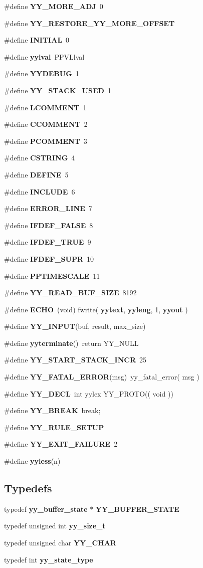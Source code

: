 \begin{CompactItemize}
\item 
\#define {\bf YY\_\-MORE\_\-ADJ}\ 0
\item 
\#define {\bf YY\_\-RESTORE\_\-YY\_\-MORE\_\-OFFSET}
\item 
\#define {\bf INITIAL}\ 0
\item 
\#define {\bf yylval}\ PPVLlval
\item 
\#define {\bf YYDEBUG}\ 1
\item 
\#define {\bf YY\_\-STACK\_\-USED}\ 1
\item 
\#define {\bf LCOMMENT}\ 1
\item 
\#define {\bf CCOMMENT}\ 2
\item 
\#define {\bf PCOMMENT}\ 3
\item 
\#define {\bf CSTRING}\ 4
\item 
\#define {\bf DEFINE}\ 5
\item 
\#define {\bf INCLUDE}\ 6
\item 
\#define {\bf ERROR\_\-LINE}\ 7
\item 
\#define {\bf IFDEF\_\-FALSE}\ 8
\item 
\#define {\bf IFDEF\_\-TRUE}\ 9
\item 
\#define {\bf IFDEF\_\-SUPR}\ 10
\item 
\#define {\bf PPTIMESCALE}\ 11
\item 
\#define {\bf YY\_\-READ\_\-BUF\_\-SIZE}\ 8192
\item 
\#define {\bf ECHO}\ (void) fwrite( {\bf yytext}, {\bf yyleng}, 1, {\bf yyout} )
\item 
\#define {\bf YY\_\-INPUT}(buf, result, max\_\-size)
\item 
\#define {\bf yyterminate}()\ return YY\_\-NULL
\item 
\#define {\bf YY\_\-START\_\-STACK\_\-INCR}\ 25
\item 
\#define {\bf YY\_\-FATAL\_\-ERROR}(msg)\ yy\_\-fatal\_\-error( msg )
\item 
\#define {\bf YY\_\-DECL}\ int yylex YY\_\-PROTO(( void ))
\item 
\#define {\bf YY\_\-BREAK}\ break;
\item 
\#define {\bf YY\_\-RULE\_\-SETUP}
\item 
\#define {\bf YY\_\-EXIT\_\-FAILURE}\ 2
\item 
\#define {\bf yyless}(n)
\end{CompactItemize}
\subsection*{Typedefs}
\begin{CompactItemize}
\item 
typedef {\bf yy\_\-buffer\_\-state} $\ast$ {\bf YY\_\-BUFFER\_\-STATE}
\item 
typedef unsigned int {\bf yy\_\-size\_\-t}
\item 
typedef unsigned char {\bf YY\_\-CHAR}
\item 
typedef int {\bf yy\_\-state\_\-type}
\end{CompactItemize}

